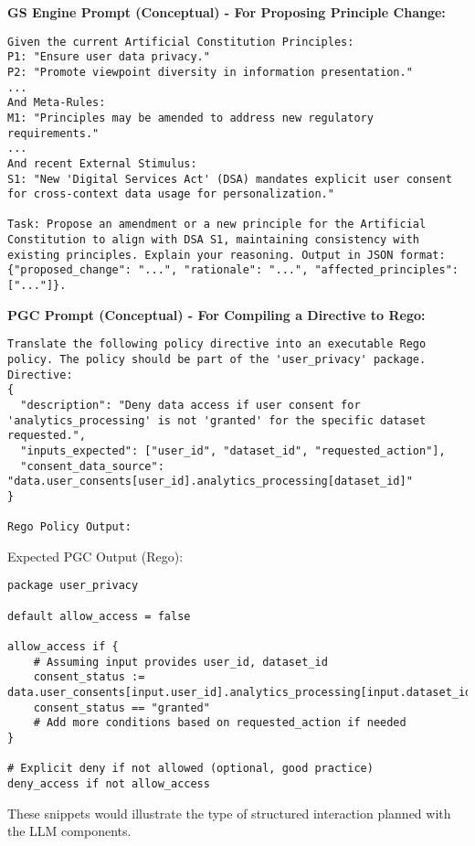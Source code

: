 \documentclass[sigconf,review,screen]{acmart}
\begin{document}
\textbf{GS Engine Prompt (Conceptual) - For Proposing Principle Change:}
\begin{lstlisting}[caption={GS Engine Prompt Example},label={lst:gs_prompt},basicstyle=\ttfamily\footnotesize,breaklines=true,keepspaces=true]
Given the current Artificial Constitution Principles:
P1: "Ensure user data privacy."
P2: "Promote viewpoint diversity in information presentation."
...
And Meta-Rules:
M1: "Principles may be amended to address new regulatory requirements."
...
And recent External Stimulus:
S1: "New 'Digital Services Act' (DSA) mandates explicit user consent for cross-context data usage for personalization."

Task: Propose an amendment or a new principle for the Artificial Constitution to align with DSA S1, maintaining consistency with existing principles. Explain your reasoning. Output in JSON format: {"proposed_change": "...", "rationale": "...", "affected_principles": ["..."]}.
\end{lstlisting}

\textbf{PGC Prompt (Conceptual) - For Compiling a Directive to Rego:}
\begin{lstlisting}[caption={PGC Prompt Example},label={lst:pgc_prompt},basicstyle=\ttfamily\footnotesize,breaklines=true,keepspaces=true]
Translate the following policy directive into an executable Rego policy. The policy should be part of the 'user_privacy' package.
Directive:
{
  "description": "Deny data access if user consent for 'analytics_processing' is not 'granted' for the specific dataset requested.",
  "inputs_expected": ["user_id", "dataset_id", "requested_action"],
  "consent_data_source": "data.user_consents[user_id].analytics_processing[dataset_id]"
}

Rego Policy Output:
\end{lstlisting}
Expected PGC Output (Rego):
\begin{lstlisting}[caption={PGC Compiled Rego Output Example},label={lst:pgc_rego_output},basicstyle=\ttfamily\footnotesize,breaklines=true,keepspaces=true]
package user_privacy

default allow_access = false

allow_access if {
    # Assuming input provides user_id, dataset_id
    consent_status := data.user_consents[input.user_id].analytics_processing[input.dataset_id]
    consent_status == "granted"
    # Add more conditions based on requested_action if needed
}

# Explicit deny if not allowed (optional, good practice)
deny_access if not allow_access
\end{lstlisting}
These snippets would illustrate the type of structured interaction planned with the LLM components.
\end{document}
